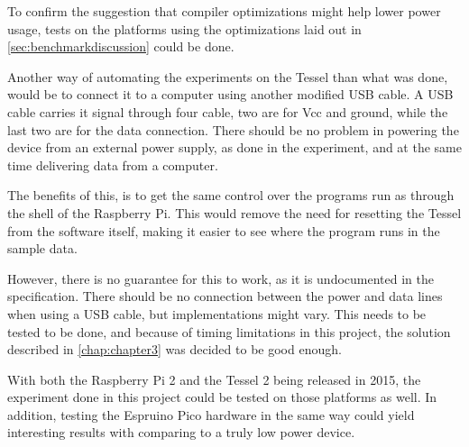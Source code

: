 To confirm the suggestion that compiler optimizations might help lower power usage, tests on the platforms using the optimizations laid out in \cref{sec:benchmarkdiscussion} could be done.

Another way of automating the experiments on the Tessel than what was done, would be to connect it to a computer using another modified USB cable.
A USB cable carries it signal through four cable, two are for Vcc and ground, while the last two are for the data connection.
There should be no problem in powering the device from an external power supply, as done in the experiment, and at the same time delivering data from a computer.

The benefits of this, is to get the same control over the programs run as through the shell of the Raspberry Pi.
This would remove the need for resetting the Tessel from the software itself, making it easier to see where the program runs in the sample data.

However, there is no guarantee for this to work, as it is undocumented in the specification.
There should be no connection between the power and data lines when using a USB cable, but implementations might vary.
This needs to be tested to be done, and because of timing limitations in this project, the solution described in \cref{chap:chapter3} was decided to be good enough.

With both the Raspberry Pi 2 and the Tessel 2 being released in 2015, the experiment done in this project could be tested on those platforms as well.
In addition, testing the Espruino Pico hardware in the same way could yield interesting results with comparing to a truly low power device.
